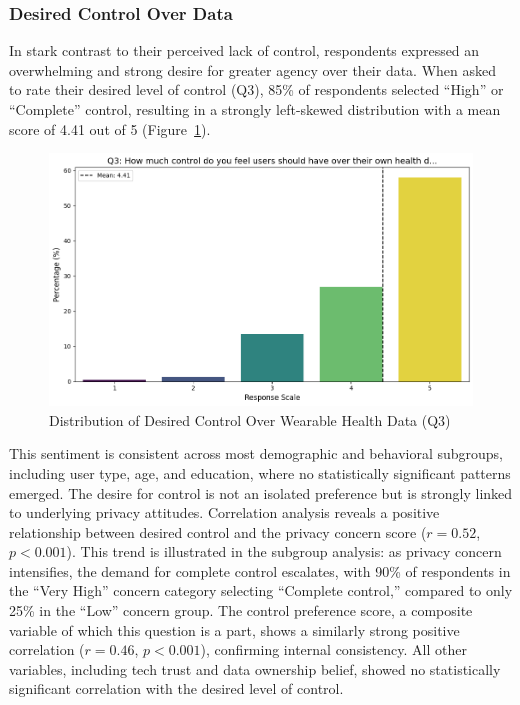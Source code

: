 	\subsubsection{Desired Control Over Data}
		In stark contrast to their perceived lack of control, respondents expressed an overwhelming and strong desire for greater agency over their data. When asked to rate their desired level of control (Q3), 85\% of respondents selected ``High'' or ``Complete'' control, resulting in a strongly left-skewed distribution with a mean score of 4.41 out of 5 (Figure~\ref{fig:desired_control_q3}). 
		\begin{figure}[ht]\centering
			\includegraphics[width=0.7\linewidth]{figures/questions/Q3_likert.png}
			\caption{Distribution of Desired Control Over Wearable Health Data (Q3)}
			\label{fig:desired_control_q3}
		\end{figure}
		This sentiment is consistent across most demographic and behavioral subgroups, including user type, age, and education, where no statistically significant patterns emerged.
		The desire for control is not an isolated preference but is strongly linked to underlying privacy attitudes. Correlation analysis reveals a positive relationship between desired control and the privacy concern score ($r = 0.52$, $p < 0.001$). This trend is illustrated in the subgroup analysis: as privacy concern intensifies, the demand for complete control escalates, with 90\% of respondents in the ``Very High'' concern category selecting ``Complete control,'' compared to only 25\% in the ``Low'' concern group. The control preference score, a composite variable of which this question is a part, shows a similarly strong positive correlation ($r = 0.46$, $p < 0.001$), confirming internal consistency. All other variables, including tech trust and data ownership belief, showed no statistically significant correlation with the desired level of control.
